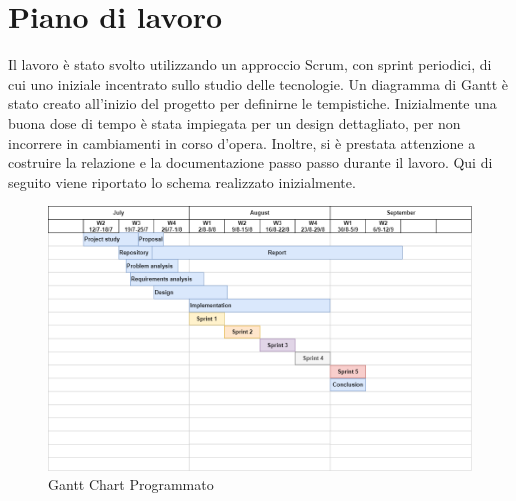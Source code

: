 

\chapter{Piano di lavoro}
Il lavoro è stato svolto utilizzando un approccio Scrum, con sprint periodici, di cui uno iniziale incentrato sullo studio delle tecnologie. Un diagramma di Gantt è stato creato all'inizio del progetto per definirne le tempistiche. Inizialmente una buona dose di tempo è stata impiegata per un design dettagliato, per non incorrere in cambiamenti in corso d'opera. Inoltre, si è prestata attenzione a costruire la relazione e la documentazione passo passo durante il lavoro. Qui di seguito viene riportato lo schema realizzato inizialmente. 
\begin{figure}[H]
    \caption{Gantt Chart Programmato}
    \label{fig:Gantt}
    \centering
    \includegraphics[width=1\textwidth]{DrawIo/GanttChart.png}
\end{figure}

